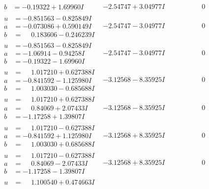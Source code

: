 \documentclass[1p]{elsarticle_modified}
\theoremstyle{definition}
\begin{document}
$$\begin{array}{c|c|c}
\begin{aligned}
b &= -0.19322 + 1.69960 I\end{aligned}
 & -2.54747 + 3.04977 I & \phantom{-0.000000 } 0 \\ \hline\begin{aligned}
u &= -0.851563 - 0.825849 I \\
a &= -0.073086 + 0.590149 I \\
b &= \phantom{-}0.183606 - 0.246239 I\end{aligned}
 & -2.54747 - 3.04977 I & \phantom{-0.000000 } 0 \\ \hline\begin{aligned}
u &= -0.851563 - 0.825849 I \\
a &= -1.06914 - 0.94258 I \\
b &= -0.19322 - 1.69960 I\end{aligned}
 & -2.54747 - 3.04977 I & \phantom{-0.000000 } 0 \\ \hline\begin{aligned}
u &= \phantom{-}1.017210 + 0.627388 I \\
a &= -0.841592 - 1.125980 I \\
b &= \phantom{-}1.003030 - 0.685688 I\end{aligned}
 & -3.12568 - 8.35925 I & \phantom{-0.000000 } 0 \\ \hline\begin{aligned}
u &= \phantom{-}1.017210 + 0.627388 I \\
a &= \phantom{-}0.84069 + 2.07433 I \\
b &= -1.17258 + 1.39807 I\end{aligned}
 & -3.12568 - 8.35925 I & \phantom{-0.000000 } 0 \\ \hline\begin{aligned}
u &= \phantom{-}1.017210 - 0.627388 I \\
a &= -0.841592 + 1.125980 I \\
b &= \phantom{-}1.003030 + 0.685688 I\end{aligned}
 & -3.12568 + 8.35925 I & \phantom{-0.000000 } 0 \\ \hline\begin{aligned}
u &= \phantom{-}1.017210 - 0.627388 I \\
a &= \phantom{-}0.84069 - 2.07433 I \\
b &= -1.17258 - 1.39807 I\end{aligned}
 & -3.12568 + 8.35925 I & \phantom{-0.000000 } 0 \\ \hline\begin{aligned}
u &= \phantom{-}1.100540 + 0.474663 I \\

\end{aligned}
\end{array}$$
\end{document}
